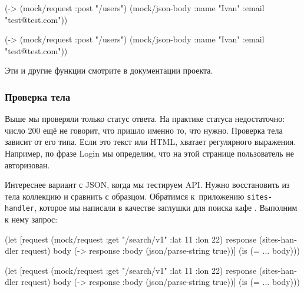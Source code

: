\ifx\DEVICETYPE\MOBILE

\begin{english}
  \begin{clojure}
(-> (mock/request :post "/users")
    (mock/json-body
      {:name "Ivan"
       :email "test@test.com"}))
  \end{clojure}
\end{english}

\else

\begin{english}
  \begin{clojure}
(-> (mock/request :post "/users")
    (mock/json-body {:name "Ivan" :email "test@test.com"}))
  \end{clojure}
\end{english}

\fi

\noindent
Эти и другие функции смотрите в документации проекта.

\subsubsection*{Проверка тела}

Выше мы проверяли только статус ответа. На практике статуса недостаточно: число
200 ещё не говорит, что пришло именно то, что нужно. Проверка тела зависит от
его типа. Если это текст или HTML, хватает регулярного выражения. Например, по
фразе Login мы определим, что на этой странице пользователь не авторизован.


Интереснее вариант с JSON, когда мы тестируем API. Нужно восстановить из тела
коллекцию и сравнить с образцом. Обратимся к~приложению \verb|sites-handler|,
которое мы написали в качестве заглушки для поиска кафе .
Выполним к нему запрос:

\ifx\DEVICETYPE\MOBILE

\begin{english}
  \begin{clojure}
(let [request (mock/request
                :get "/search/v1"
                {:lat 11 :lon 22})
      response (sites-handler request)
      body (-> response
               :body
               (json/parse-string
                 true))]
  (is (= {...} body)))
  \end{clojure}
\end{english}

\else

\begin{english}
  \begin{clojure}
(let [request (mock/request :get "/search/v1"
                            {:lat 11 :lon 22})
      response (sites-handler request)
      body (-> response :body (json/parse-string true))]
  (is (= {...} body)))
  \end{clojure}
\end{english}

